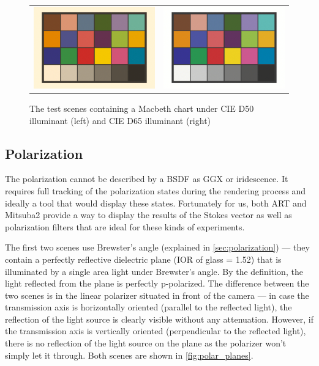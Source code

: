 \begin{figure}[h]
	\begin{tabular}{cc}
		\includegraphics[width=.45\linewidth]{img/macbeth_chart_D50.png}
		&
		\includegraphics[width=.45\linewidth]{img/macbeth_chart_D65.png}
	\end{tabular}
	\caption{The test scenes containing a Macbeth chart under CIE D50 illuminant (left) and CIE D65 illuminant (right)}
	\label{fig:macbeth}
\end{figure}

\subsection{Polarization}

The polarization cannot be described by a BSDF as GGX or iridescence. It requires full tracking of the polarization states during the rendering process and ideally a tool that would display these states. Fortunately for us, both ART and Mitsuba2 provide a way to display the results of the Stokes vector as well as polarization filters that are ideal for these kinds of experiments.

The first two scenes use Brewster's angle (explained in \autoref{sec:polarization}) --- they contain a perfectly reflective dielectric plane (IOR of glass = 1.52) that is illuminated by a single area light under Brewster's angle. By the definition, the light reflected from the plane is perfectly p-polarized. The difference between the two scenes is in the linear polarizer situated in front of the camera --- in case the transmission axis is horizontally oriented (parallel to the reflected light), the reflection of the light source is clearly visible without any attenuation. However, if the transmission axis is vertically oriented (perpendicular to the reflected light), there is no reflection of the light source on the plane as the polarizer won't simply let it through. Both scenes are shown in \autoref{fig:polar_planes}.

